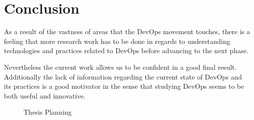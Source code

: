 \chapter{ Conclusion } \label{chap:conclusion}

 As a result of the vastness of areas that the DevOps movement touches, there is a feeling that more research work has to be done in regards to understanding technologies and practices related to DevOps before advancing to the next phase. 
 
 Nevertheless the current work allows us to be confident in a good final result. Additionally the lack of information regarding the current state of DevOps and its practices is a good motivator in the sense that studying DevOps seems to be both useful and innovative.
 
 
 \begin{figure}[!ht]
  \caption{Thesis Planning}
  \centering
   
\end{figure}
 
 